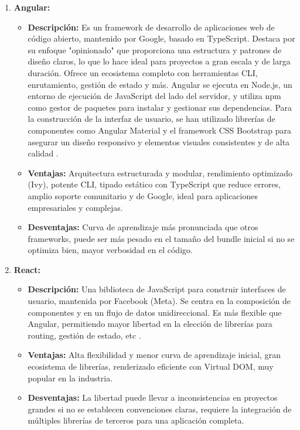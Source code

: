 \begin{enumerate}

    \item \textbf{Angular:}
    
    \begin{itemize}
        \item \textbf{Descripción:} Es un framework de desarrollo de aplicaciones web de código abierto, mantenido por Google, basado en TypeScript. Destaca por su enfoque "opinionado" que proporciona una estructura y patrones de diseño claros, lo que lo hace ideal para proyectos a gran escala y de larga duración. Ofrece un ecosistema completo con herramientas CLI, enrutamiento, gestión de estado y más. Angular se ejecuta en Node.js, un entorno de ejecución de JavaScript del lado del servidor, y utiliza npm como gestor de paquetes para instalar y gestionar sus dependencias. Para la construcción de la interfaz de usuario, se han utilizado librerías de componentes como Angular Material y el framework CSS Bootstrap para asegurar un diseño responsivo y elementos visuales consistentes y de alta calidad \cite{hiberus2024angular}.
        \item \textbf{Ventajas:} Arquitectura estructurada y modular, rendimiento optimizado (Ivy), potente CLI, tipado estático con TypeScript que reduce errores, amplio soporte comunitario y de Google, ideal para aplicaciones empresariales y complejas.
        \item \textbf{Desventajas:} Curva de aprendizaje más pronunciada que otros frameworks, puede ser más pesado en el tamaño del bundle inicial si no se optimiza bien, mayor verbosidad en el código.
    \end{itemize}

    \item \textbf{React:}
    \begin{itemize}
        \item \textbf{Descripción:} Una biblioteca de JavaScript para construir interfaces de usuario, mantenida por Facebook (Meta). Se centra en la composición de componentes y en un flujo de datos unidireccional. Es más flexible que Angular, permitiendo mayor libertad en la elección de librerías para routing, gestión de estado, etc \cite{hiberus2024angular}.
        \item \textbf{Ventajas:} Alta flexibilidad y menor curva de aprendizaje inicial, gran ecosistema de librerías, renderizado eficiente con Virtual DOM, muy popular en la industria.
        \item \textbf{Desventajas:} La libertad puede llevar a inconsistencias en proyectos grandes si no se establecen convenciones claras, requiere la integración de múltiples librerías de terceros para una aplicación completa.
    \end{itemize}


\end{enumerate}
